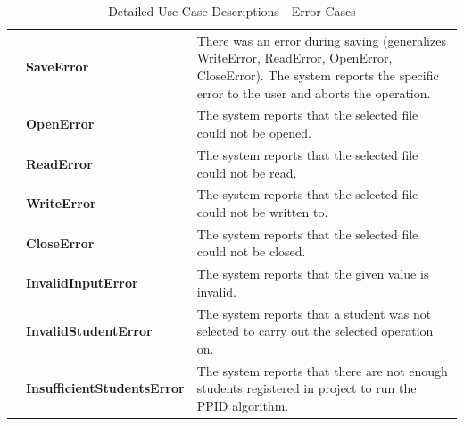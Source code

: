 \documentclass[12pt,letterpaper]{article}
\begin{document}
\begin{table}[H]
	\caption{Detailed Use Case Descriptions - Error Cases}
	\vspace{1em}
	\begin{tabu} to 
		\saveerror{} & SaveError & There was an error during saving (generalizes WriteError, ReadError, OpenError, CloseError). 
		The system reports the specific error to the user and aborts the operation.\\
		\openerror{} & OpenError & The system reports that the selected file could not be opened.\\
		\readerror{} & ReadError & The system reports that the selected file could not be read.\\
		\writeerror{} & WriteError & The system reports that the selected file could not be written to.\\
		\closeerror{} & CloseError & The system reports that the selected file could not be closed.\\
		\invalidinputerror{} & InvalidInputError & The system reports that the given value is invalid.\\
		\invalidstudenterror{} & InvalidStudentError & The system reports that a student was not selected to carry out the selected 
		operation on.\\
		\insufficientstudentserror{} & InsufficientStudentsError & The system reports that there are not enough students registered in project to
		 run the PPID algorithm.\\
	\end{tabu}
\end{table}
\end{document}
